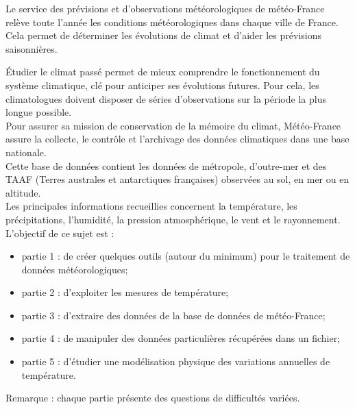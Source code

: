 \documentclass[10pt,fleqn]{article} %
\begin{document}

\vspace{1.7cm}
\pagestyle{fancy}
\thispagestyle{plain}


\begin{obj}
Le service des prévisions et d'observations météorologiques de météo-France relève 
toute l'année les conditions météorologiques dans chaque ville de France.\\
Cela permet de déterminer les évolutions de climat et d'aider les prévisions saisonnières.
 
Étudier le climat passé permet de mieux comprendre le fonctionnement du système climatique, 
clé pour anticiper ses évolutions futures.
 Pour cela, les climatologues doivent disposer de séries d'observations sur la période 
 la plus longue possible.\\
 
Pour assurer sa mission de conservation de la mémoire du climat, Météo-France assure 
la collecte, le contrôle et l'archivage des données climatiques dans une base nationale.\\ 
Cette base de données contient les données de métropole, d'outre-mer et des TAAF 
(Terres australes et antarctiques françaises) observées au sol, en mer ou en altitude. \\
Les principales informations recueillies concernent la température, les précipitations, l'humidité,
 la pression atmosphérique, le vent et le rayonnement.\\
 
 L'objectif de ce sujet est :
\begin{itemize}
 \item partie 1 : de créer quelques outils (autour du minimum) pour le traitement de données
  météorologiques;
 \item partie 2 : d'exploiter les mesures de température;
 \item partie 3 : d'extraire des données de la base de données de météo-France;
 \item partie 4 : de manipuler des données particulières récupérées dans un fichier;
 \item partie 5 : d'étudier une modélisation physique des variations annuelles de température.
 \end{itemize}
Remarque : chaque partie présente des questions de difficultés variées. 
  
\end{obj}
\end{document}
